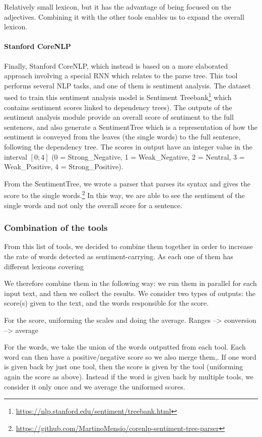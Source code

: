Relatively small lexicon, but it has the advantage of being focused on the adjectives. Combining it with the other tools enables us to expand the overall lexicon.


\paragraph{Stanford CoreNLP}
Finally, Stanford CoreNLP, which instead is based on a more elaborated approach involving a special RNN which relates to the parse tree. This tool performs several NLP tasks, and one of them is sentiment analysis.
The dataset used to train this sentiment analysis model is Sentiment Treebank\footnote{\url{https://nlp.stanford.edu/sentiment/treebank.html}} which contains sentiment scores linked to dependency trees).
The outputs of the sentiment analysis module provide an overall score of sentiment to the full sentences, and also generate a SentimentTree which is a representation of how the sentiment is conveyed from the leaves (the single words) to the full sentence, following the dependency tree.
The scores in output have an integer value in the interval $[0;4]$ (0 = Strong\_Negative, 1 = Weak\_Negative, 2 = Neutral, 3 = Weak\_Positive, 4 = Strong\_Positive).

From the SentimentTree, we wrote a parser that parses its syntax and gives the score to the single words.\footnote{\url{https://github.com/MartinoMensio/corenlp-sentiment-tree-parser}}
In this way, we are able to see the sentiment of the single words and not only the overall score for a sentence.

\subsubsection{\statusorange Combination of the tools}
From this list of tools, we decided to combine them together in order to increase the rate of words detected as sentiment-carrying. As each one of them has different lexicons covering 

We therefore combine them in the following way:
we run them in parallel for each input text, and then we collect the results.
We consider two types of outputs: the score(s) given to the text, and the words responsible for the score.

For the score, uniforming the scales and doing the average. Ranges --> conversion --> average

For the words, we take the union of the words outputted from each tool. Each word can then have a positive/negative score so we also merge them,.
If one word is given back by just one tool, then the score is given by the tool (uniforming again the score as above). Instead if the word is given back by multiple tools, we consider it only once and we average the uniformed scores. 


